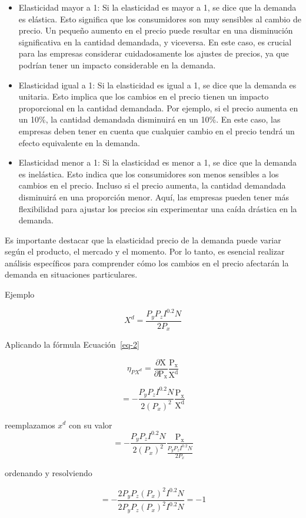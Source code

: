 \documentclass[
  jou,
  floatsintext,
  longtable,
  a4paper,
  nolmodern,
  notxfonts,
  notimes,
  colorlinks=true,linkcolor=blue,citecolor=blue,urlcolor=blue]{apa7}
\begin{document}
\begin{itemize}
\item
  Elasticidad mayor a 1: Si la elasticidad es mayor a 1, se dice que la
  demanda es elástica. Esto significa que los consumidores son muy
  sensibles al cambio de precio. Un pequeño aumento en el precio puede
  resultar en una disminución significativa en la cantidad demandada, y
  viceversa. En este caso, es crucial para las empresas considerar
  cuidadosamente los ajustes de precios, ya que podrían tener un impacto
  considerable en la demanda.
\item
  Elasticidad igual a 1: Si la elasticidad es igual a 1, se dice que la
  demanda es unitaria. Esto implica que los cambios en el precio tienen
  un impacto proporcional en la cantidad demandada. Por ejemplo, si el
  precio aumenta en un 10\%, la cantidad demandada disminuirá en un
  10\%. En este caso, las empresas deben tener en cuenta que cualquier
  cambio en el precio tendrá un efecto equivalente en la demanda.
\item
  Elasticidad menor a 1: Si la elasticidad es menor a 1, se dice que la
  demanda es inelástica. Esto indica que los consumidores son menos
  sensibles a los cambios en el precio. Incluso si el precio aumenta, la
  cantidad demandada disminuirá en una proporción menor. Aquí, las
  empresas pueden tener más flexibilidad para ajustar los precios sin
  experimentar una caída drástica en la demanda.
\end{itemize}

Es importante destacar que la elasticidad precio de la demanda puede
variar según el producto, el mercado y el momento. Por lo tanto, es
esencial realizar análisis específicos para comprender cómo los cambios
en el precio afectarán la demanda en situaciones particulares.

Ejemplo

\[
X^d = \frac{P_y P_z I^{0.2} N}{2 P_x}
\]

Aplicando la fórmula Ecuación~\ref{eq-2}

\[ 
\eta _{PX^d} = \frac{\partial \mathrm{X}}{\partial \mathrm{P_x}} \frac{\mathrm{P_x}}{\mathrm{X^d}} 
\]

\[
= - \frac{P_y P_z I^{0.2} N}{2 (P_x)^2} \frac{\mathrm{P_x}}{\mathrm{X^d} }
\]

reemplazamos \(x^d\) con su valor \[
= - \frac{P_y P_z I^{0.2} N}{2 (P_x)^2} \frac{\mathrm{P_x}}{\frac{P_y P_z I^{0.2} N}{2 P_x} }
\]

ordenando y resolviendo

\[
= - \frac{2 P_y P_z (P_x)^2 I^{0.2} N}{2 P_y P_z (P_x)^2 I^{0.2} N} = -1
\]
\end{document}
